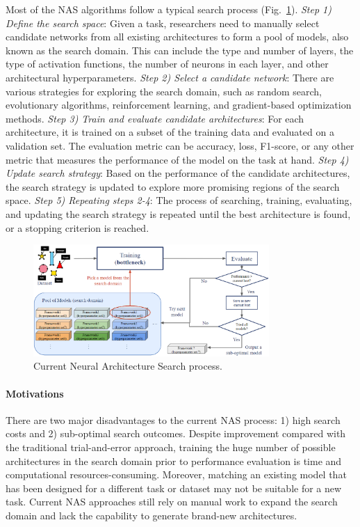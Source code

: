 \documentclass{article}
\begin{document}
Most of the NAS algorithms follow a typical search process (Fig.~\ref{current_nas}). \textit{Step 1) Define the search space}: Given a task, researchers need to manually select candidate networks from all existing architectures to form a pool of models, also known as the search domain. This can include the type and number of layers, the type of activation functions, the number of neurons in each layer, and other architectural hyperparameters. \textit{Step 2) Select a candidate network}: There are various strategies for exploring the search domain, such as random search, evolutionary algorithms, reinforcement learning, and gradient-based optimization methods. \textit{Step 3) Train and evaluate candidate architectures}: For each architecture, it is trained on a subset of the training data and evaluated on a validation set. The evaluation metric can be accuracy, loss, F1-score, or any other metric that measures the performance of the model on the task at hand. \textit{Step 4) Update search strategy}: Based on the performance of the candidate architectures, the search strategy is updated to explore more promising regions of the search space. \textit{Step 5) Repeating steps 2-4}: The process of searching, training, evaluating, and updating the search strategy is repeated until the best architecture is found, or a stopping criterion is reached. 

\begin{figure}
  \centering
  \includegraphics[width=0.8\textwidth]{images/current_nas.png}
  \caption{Current Neural Architecture Search process.}
  \label{current_nas}
\end{figure}

\paragraph{Motivations} There are two major disadvantages to the current NAS process: 1) high search costs and 2) sub-optimal search outcomes. Despite improvement compared with the traditional trial-and-error approach, training the huge number of possible architectures in the search domain prior to performance evaluation is time and computational resources-consuming. Moreover, matching an existing model that has been designed for a different task or dataset may not be suitable for a new task. Current NAS approaches still rely on manual work to expand the search domain and lack the capability to generate brand-new architectures. 
\end{document}
